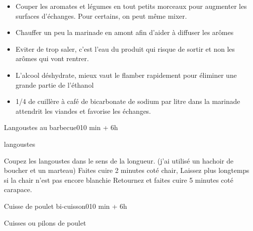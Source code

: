 {\renewcommand{\section}[1]{}

\section{Optimiser une marinade}
\begin{itemize}
\item Couper les aromates et légumes en tout petits morceaux pour augmenter les surfaces d'échanges. Pour certains, on peut même mixer. 
\item Chauffer un peu la marinade en amont afin d'aider à diffuser les arômes
\item Eviter de trop saler, c'est l'eau du produit qui risque de sortir et non les arômes qui vont rentrer. 
\item L'alcool déshydrate, mieux vaut le flamber rapidement pour éliminer une grande partie de l'éthanol
\item 1/4 de cuillère à café  de bicarbonate de sodium par litre dans la marinade attendrit les viandes et favorise les échanges. 
\end{itemize}

\section{Langoustes au barbecue}
\begin{recette}{Langoustes au barbecue}{0}{10 min + 6h}{}
\begin{ingredients}
\ingredient langoustes
\end{ingredients}

\begin{preparation}
\etape Coupez les langoustes dans le sens de la longueur. (j'ai utilisé un hachoir de boucher et un marteau)
\etape Faites cuire 2 minutes coté chair, Laissez plus longtemps si la chair n'est pas encore blanchie
\etape Retournez et faites cuire 5 minutes coté carapace.
\end{preparation}
\end{recette}

\section{Cuisse de poulet bi-cuisson}
\begin{recette}{Cuisse de poulet bi-cuisson}{0}{10 min + 6h}{}
\begin{ingredients}
\ingredient Cuisses ou pilons de poulet
\end{ingredients}


\end{recette}}
